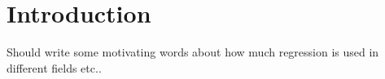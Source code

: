 \section{Introduction} \label{sec:introduction}
Should write some motivating words about how much regression is used in different fields etc..